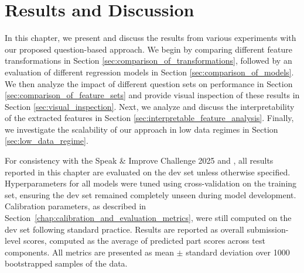 \documentclass{report}
\begin{document}
\chapter{Results and Discussion}
\label{chap:results_discussion}
In this chapter, we present and discuss the results from various experiments with our proposed question-based approach. We begin by comparing different feature transformations in Section \ref{sec:comparison_of_transformations}, followed by an evaluation of different regression models in Section \ref{sec:comparison_of_models}. We then analyze the impact of different question sets on performance in Section \ref{sec:comparison_of_feature_sets} and provide visual inspection of these results in Section \ref{sec:visual_inspection}. Next, we analyze and discuss the interpretability of the extracted features in Section \ref{sec:interpretable_feature_analysis}. Finally, we investigate the scalability of our approach in low data regimes in Section \ref{sec:low_data_regime}.

For consistency with the Speak \& Improve Challenge 2025 \citep{qian2024sandi} and \citet{ma2025assessment}, all results reported in this chapter are evaluated on the dev set unless otherwise specified. 
Hyperparameters for all models were tuned using cross-validation on the training set, ensuring the dev set remained completely unseen during model development. Calibration parameters, as described in Section~\ref{chap:calibration_and_evaluation_metrics}, were still computed on the dev set following standard practice.
Results are reported as overall submission-level scores, computed as the average of predicted part scores across test components. All metrics are presented as mean $\pm$ standard deviation over 1000 bootstrapped samples of the data.
\end{document}
